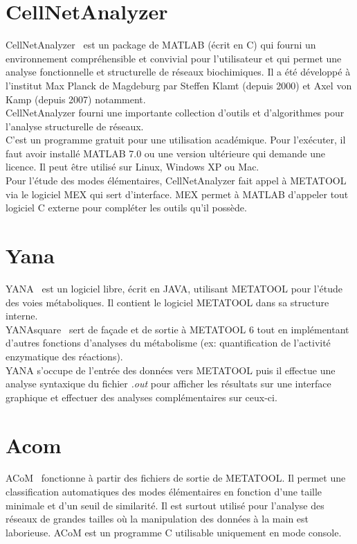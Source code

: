 \section{CellNetAnalyzer}
CellNetAnalyzer~\cite{cna:url} est un package de MATLAB (écrit en \textsc{C}) qui fourni un environnement compréhensible et convivial pour l'utilisateur et qui permet une analyse fonctionnelle et structurelle de réseaux biochimiques. Il a été développé à l'institut Max Planck de Magdeburg par Steffen Klamt (depuis 2000) et Axel von Kamp (depuis 2007) notamment.\\
CellNetAnalyzer fourni une importante collection d'outils et d'algorithmes pour l'analyse structurelle de réseaux.\\
C'est un programme gratuit pour une utilisation académique. Pour l'exécuter, il faut avoir installé MATLAB 7.0 ou une version ultérieure qui demande une licence. Il peut être utilisé sur Linux, Windows XP ou Mac.\\
Pour l'étude des modes élémentaires, CellNetAnalyzer fait appel à METATOOL via le logiciel MEX qui sert d'interface. MEX permet à MATLAB d'appeler tout logiciel \textsc{C} externe pour compléter les outils qu'il possède.

\section{Yana}
YANA~\cite{yana:url} est un logiciel libre, écrit en JAVA, utilisant METATOOL pour l'étude
des voies métaboliques. Il contient le logiciel METATOOL dans sa structure interne. \\
YANAsquare~\cite{yanasq:url} sert de façade et de sortie à METATOOL 6 tout en implémentant d'autres fonctions d'analyses du métabolisme (ex: quantification de l'activité enzymatique des réactions).\\ YANA s'occupe de l'entrée des données vers METATOOL puis il effectue une analyse syntaxique du fichier \textit{.out} pour afficher les résultats sur une interface graphique et effectuer des analyses complémentaires sur ceux-ci.

\section{Acom}
ACoM~\cite{acom:url} fonctionne à partir des fichiers de sortie de METATOOL. Il permet une classification automatiques des modes élémentaires en fonction d'une taille minimale et d'un seuil de similarité. Il est surtout utilisé pour l'analyse des réseaux de grandes tailles où la manipulation des données à la main est laborieuse. ACoM est un programme
C utilisable uniquement en mode console.

